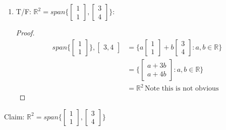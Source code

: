 \documentclass[11pt]{article}
\theoremstyle{plain}
\theoremstyle{remark}
\theoremstyle{plain}
\newcommand{\rn}{\mathbb{R}}
\begin{document}
\begin{tcolorbox}[colback=magenta!5!white,colframe=magenta!75!black,title=Problem 4]
\begin{enumerate}
       \item T/F: $\rn^2=span\{\begin{bmatrix}
           1\\1
       \end{bmatrix}, \begin{bmatrix}
           3\\4
       \end{bmatrix}\}$:
       \begin{proof}
           \begin{align*}
               span\{\begin{bmatrix}
                   1\\1
               \end{bmatrix}\}, \begin{bmatrix}
                   3, 4
               \end{bmatrix}&=\{a\begin{bmatrix}
                   1\\1
               \end{bmatrix}+b\begin{bmatrix}
                   3\\4
               \end{bmatrix}:a, b\in\rn\}\\
               &=\{\begin{bmatrix}
                   a+3b\\a+4b
               \end{bmatrix}:a,b\in\rn\}\\
               &=\rn^2 \,\text{Note this is not obvious}
           \end{align*}
       \end{proof}
    \end{enumerate}
\end{tcolorbox}   

Claim: $\rn^2 = span\{\begin{bmatrix}
    1\\1
\end{bmatrix}, \begin{bmatrix}
    3\\4
\end{bmatrix}\}$
\end{document}

